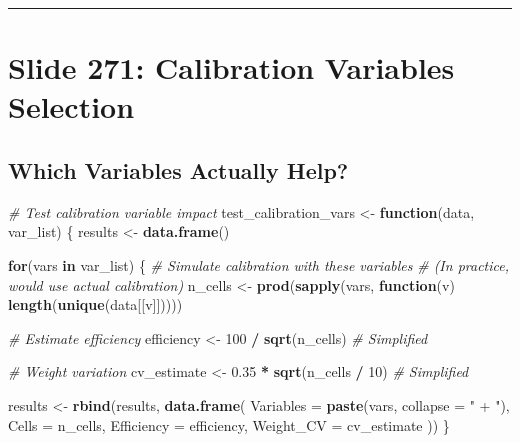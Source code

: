 \documentclass[
]{article}
\newenvironment{Shaded}{\begin{snugshade}}{\end{snugshade}}
\newcommand{\AttributeTok}[1]{\textcolor[rgb]{0.13,0.29,0.53}{#1}}
\newcommand{\CommentTok}[1]{\textcolor[rgb]{0.56,0.35,0.01}{\textit{#1}}}
\newcommand{\ControlFlowTok}[1]{\textcolor[rgb]{0.13,0.29,0.53}{\textbf{#1}}}
\newcommand{\DecValTok}[1]{\textcolor[rgb]{0.00,0.00,0.81}{#1}}
\newcommand{\FloatTok}[1]{\textcolor[rgb]{0.00,0.00,0.81}{#1}}
\newcommand{\FunctionTok}[1]{\textcolor[rgb]{0.13,0.29,0.53}{\textbf{#1}}}
\newcommand{\NormalTok}[1]{#1}
\newcommand{\OtherTok}[1]{\textcolor[rgb]{0.56,0.35,0.01}{#1}}
\newcommand{\SpecialCharTok}[1]{\textcolor[rgb]{0.81,0.36,0.00}{\textbf{#1}}}
\newcommand{\StringTok}[1]{\textcolor[rgb]{0.31,0.60,0.02}{#1}}
\begin{document}
\begin{center}\rule{0.5\linewidth}{0.5pt}\end{center}

\section{Slide 271: Calibration Variables
Selection}\label{slide-271-calibration-variables-selection}

\subsection{Which Variables Actually
Help?}\label{which-variables-actually-help}

\begin{Shaded}
\begin{Highlighting}[]
\CommentTok{\# Test calibration variable impact}
\NormalTok{test\_calibration\_vars }\OtherTok{\textless{}{-}} \ControlFlowTok{function}\NormalTok{(data, var\_list) \{}
\NormalTok{  results }\OtherTok{\textless{}{-}} \FunctionTok{data.frame}\NormalTok{()}
  
  \ControlFlowTok{for}\NormalTok{(vars }\ControlFlowTok{in}\NormalTok{ var\_list) \{}
    \CommentTok{\# Simulate calibration with these variables}
    \CommentTok{\# (In practice, would use actual calibration)}
\NormalTok{    n\_cells }\OtherTok{\textless{}{-}} \FunctionTok{prod}\NormalTok{(}\FunctionTok{sapply}\NormalTok{(vars, }\ControlFlowTok{function}\NormalTok{(v) }\FunctionTok{length}\NormalTok{(}\FunctionTok{unique}\NormalTok{(data[[v]]))))}
    
    \CommentTok{\# Estimate efficiency}
\NormalTok{    efficiency }\OtherTok{\textless{}{-}} \DecValTok{100} \SpecialCharTok{/} \FunctionTok{sqrt}\NormalTok{(n\_cells)  }\CommentTok{\# Simplified}
    
    \CommentTok{\# Weight variation}
\NormalTok{    cv\_estimate }\OtherTok{\textless{}{-}} \FloatTok{0.35} \SpecialCharTok{*} \FunctionTok{sqrt}\NormalTok{(n\_cells }\SpecialCharTok{/} \DecValTok{10}\NormalTok{)  }\CommentTok{\# Simplified}
    
\NormalTok{    results }\OtherTok{\textless{}{-}} \FunctionTok{rbind}\NormalTok{(results, }\FunctionTok{data.frame}\NormalTok{(}
      \AttributeTok{Variables =} \FunctionTok{paste}\NormalTok{(vars, }\AttributeTok{collapse =} \StringTok{" + "}\NormalTok{),}
      \AttributeTok{Cells =}\NormalTok{ n\_cells,}
      \AttributeTok{Efficiency =}\NormalTok{ efficiency,}
      \AttributeTok{Weight\_CV =}\NormalTok{ cv\_estimate}
\NormalTok{    ))}
\NormalTok{  \}}
  

\end{Highlighting}
\end{Shaded}
\end{document}

